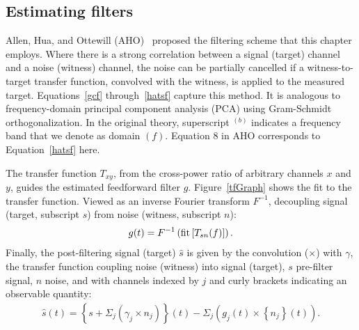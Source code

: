         \subsection{Estimating filters}
        \label{filter_est}

	Allen, Hua, and Ottewill (AHO)~\cite{AllenHuaOttewill1999} proposed the filtering scheme that this chapter employs. Where there is a strong correlation between a signal (target) channel and a noise (witness) channel, the noise can be partially cancelled if a witness-to-target transfer function, convolved with the witness, is applied to the measured target.
	Equations~\ref{gcf} through~\ref{hatsf} capture this method. It is analogous to frequency-domain principal component analysis (PCA) using Gram-Schmidt orthogonalization. In the original theory, superscript $^{(b)}$ indicates a frequency band that we denote as domain $(f)$. 
Equation 8 in AHO corresponds to Equation~\ref{hatsf} here.

The transfer function $T_{xy}$, from the cross-power ratio of arbitrary channels $x$ and $y$, 
guides the estimated feedforward filter $g$. Figure~\ref{tfGraph} shows the fit to the transfer function. Viewed as an inverse Fourier transform $F^{-1}$, decoupling signal (target, subscript $s$) from noise (witness, subscript $n$):
            \begin{eqnarray}
            g(t) = F^{-1} \left( \textup{fit} \left[ T_{sn} (f) \right] \right) \label{gcf}.
            \end{eqnarray}
\noindent Finally, the post-filtering signal (target) $\hat{s}$ is given by the convolution ($\times$) with $\gamma$, the transfer function coupling noise (witness) into signal (target), $s$ pre-filter signal, $n$ noise, and with channels indexed by $j$ and curly brackets indicating an observable quantity: 
            \begin{eqnarray}
            \hat{s} (t) = \left\{ s + \Sigma_j \left(\gamma_j \times n_j\right)\right\} (t) - \Sigma_j \left(g_{j} (t) \times \left\{ n_{j} \right\} (t)\right) \label{hatsf}.
            \end{eqnarray}


